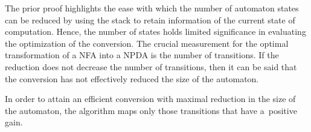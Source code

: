         \vspace*{-1em}
        The prior proof highlights the ease with which the number of automaton states can be reduced by using the stack to retain information of the current state of computation. Hence, the number of states holds limited significance in evaluating the optimization of the conversion. The crucial measurement for the optimal transformation of a NFA into a NPDA is the number of transitions. If the reduction  does not decrease the number of transitions, then it can be said that the conversion has not effectively reduced the size of the automaton.

        In order to attain an efficient conversion with maximal reduction in the size of the automaton, the algorithm maps only those transitions that have a~positive gain.

